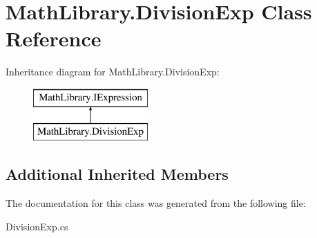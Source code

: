 \hypertarget{class_math_library_1_1_division_exp}{}\section{Math\+Library.\+Division\+Exp Class Reference}
\label{class_math_library_1_1_division_exp}
Inheritance diagram for Math\+Library.\+Division\+Exp\+:\begin{figure}[H]
\begin{center}
\leavevmode
\includegraphics[height=2.000000cm]{class_math_library_1_1_division_exp}
\end{center}
\end{figure}
\subsection*{Additional Inherited Members}


The documentation for this class was generated from the following file\+:\begin{DoxyCompactItemize}
\item 
Division\+Exp.\+cs\end{DoxyCompactItemize}
